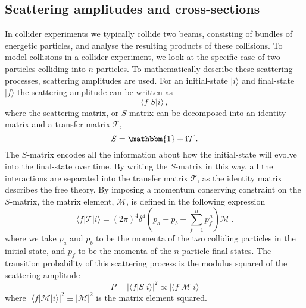 \documentclass[main.tex]{subfiles}
\begin{document}
\subsection{Scattering amplitudes and cross-sections}
    In collider experiments we typically collide
    two beams, consisting of bundles of energetic
    particles, and analyse the resulting products
    of these collisions. To model collisions in
    a collider experiment, we look at the specific
    case of two particles colliding into $n$ particles.
    To mathematically describe these
    scattering processes, scattering amplitudes are used.
    For an initial-state
    $|i\rangle$ and final-state $|f\rangle$
    the scattering amplitude can be written as
    \begin{equation}\label{eqn:scattering}
        \langle f | S | i \rangle \, ,
    \end{equation}
    where the scattering matrix, or $S$-matrix
    can be decomposed into an identity matrix
    and a transfer matrix $\mathcal{T}$,
    \begin{equation}\label{eqn:S_matrix}
        S = \mathbbm{1} + \mathrm{i}\mathcal{T} \, .
    \end{equation}
    The $S$-matrix encodes all the information
    about how the initial-state will evolve
    into the final-state over time. By writing
    the $S$-matrix in this way, all the interactions
    are separated into the transfer matrix $\mathcal{T}$,
    as the identity matrix describes the free theory.
    By imposing a momentum conserving constraint
    on the $S$-matrix, the matrix element,
    $\mathcal{M}$, is defined in the following expression
    \begin{equation}\label{eqn:matrix_element}
        \langle f | \mathcal{T} | i \rangle = (2\pi)^{4} \delta^{4}\left(p_{a} + p_{b} - \sum_{f=1}^{n} p_{f}^{\mu}\right) \mathcal{M} \, .
    \end{equation}
    where we take $p_{a}$ and $p_{b}$ to be
    the momenta of the two colliding
    particles in the initial-state, and $p_{f}$ to be the
    momenta of the $n$-particle final states.
    The transition probability of this scattering process
    is the modulus squared of the scattering amplitude
    \begin{equation}\label{eqn:S_prob}
        P = |\langle f | S | i \rangle|^{2} \propto |\langle f | \mathcal{M} | i \rangle 
    \end{equation}
    where $|\langle f | \mathcal{M} | i \rangle|^{2}  \equiv |\mathcal{M}|^{2}$
    is the matrix element squared.
\end{document}
